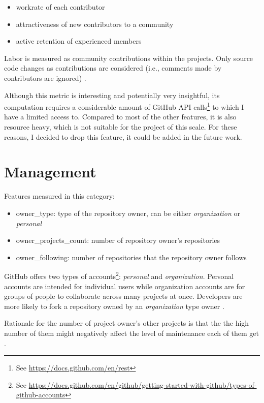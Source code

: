 \begin{itemize}
    \item workrate of each contributor
    \item attractiveness of new contributors to a community
    \item active retention of experienced members
\end{itemize}

Labor is measured as community contributions within the projects.
Only source code changes as contributions are considered (i.e., comments made by contributors are ignored) \cite{p:18}.

Although this metric is interesting and potentially very insightful, its computation requires a considerable amount of GitHub API calls\footnote{See \url{https://docs.github.com/en/rest}} to which I have a limited access to.
Compared to most of the other features, it is also resource heavy, which is not suitable for the project of this scale.
For these reasons, I decided to drop this feature, it could be added in the future work.

\section{Management}
\label{sec:management}

Features measured in this category:

\begin{itemize}
    \item owner\_type: type of the repository owner, can be either \emph{organization} or \emph{personal}
    \item owner\_projects\_count: number of repository owner's repositories
    \item owner\_following: number of repositories that the repository owner follows
\end{itemize}

GitHub offers two types of accounts\footnote{See \url{https://docs.github.com/en/github/getting-started-with-github/types-of-github-accounts}}: \emph{personal} and \emph{organization}.
Personal accounts are intended for individual users while organization accounts are for groups of people to collaborate across many projects at once.
Developers are more likely to fork a repository owned by an \emph{organization} type owner \cite{p:10}.

Rationale for the number of project owner's other projects is that the the high number of them might negatively affect the level of maintenance each of them get \cite{p:7}.

